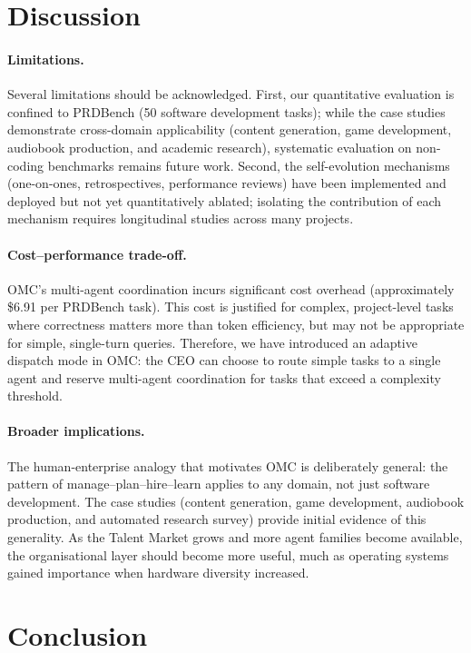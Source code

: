\documentclass[11pt,a4paper]{article}
\begin{document}
\section{Discussion}
\label{sec:discussion}

\paragraph{Limitations.}
Several limitations should be acknowledged.  First, our quantitative evaluation is confined to PRDBench (50 software development tasks); while the case studies demonstrate cross-domain applicability (content generation, game development, audiobook production, and academic research), systematic evaluation on non-coding benchmarks remains future work.  Second, the self-evolution mechanisms (one-on-ones, retrospectives, performance reviews) have been implemented and deployed but not yet quantitatively ablated; isolating the contribution of each mechanism requires longitudinal studies across many projects.
\paragraph{Cost--performance trade-off.}
OMC's multi-agent coordination incurs significant cost overhead (approximately \$6.91 per PRDBench task).  This cost is justified for complex, project-level tasks where correctness matters more than token efficiency, but may not be appropriate for simple, single-turn queries. Therefore, we have introduced an adaptive dispatch mode in OMC: the CEO can choose to route simple tasks to a single agent and reserve multi-agent coordination for tasks that exceed a complexity threshold.

\paragraph{Broader implications.}
The human-enterprise analogy that motivates OMC is deliberately general: the pattern of manage--plan--hire--learn applies to any domain, not just software development.  The case studies (content generation, game development, audiobook production, and automated research survey) provide initial evidence of this generality.  As the Talent Market grows and more agent families become available, the organisational layer should become more useful, much as operating systems gained importance when hardware diversity increased.



\section{Conclusion}
\label{sec:conclusion}
\end{document}
